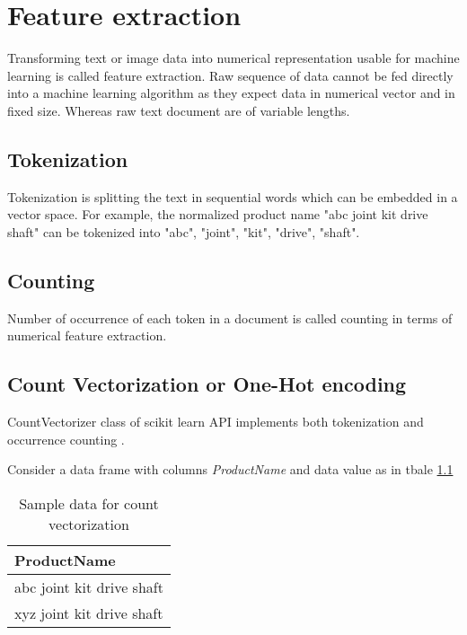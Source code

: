\chapter{Feature extraction}

Transforming text or image data into numerical representation usable for machine learning is called feature extraction. Raw sequence of data cannot be fed directly into a machine learning algorithm as they expect data in numerical vector and in fixed size. Whereas raw text document are of variable lengths. 

\section{Tokenization}

Tokenization is splitting the text in sequential words which can be embedded in a vector space.
For example, the normalized product name "abc joint kit drive shaft" can be tokenized into "abc", "joint", "kit", "drive", "shaft". 



\section{Counting}

Number of occurrence of each token in a document is called counting in terms of numerical feature extraction.

\section{Count Vectorization or One-Hot encoding} \label{ch_countvector}


CountVectorizer class of scikit learn API implements both tokenization and occurrence counting \parencite{sklearn_api}. 

Consider a data frame with columns \textit{ProductName} and data value as in tbale \ref{table:count_vectorization}

\begin{table}[h]
    \centering
    \caption{Sample data for count vectorization}
    \label{table:count_vectorization}
    \begin{tabular}{ l }
          \toprule
          
          \textbf{ProductName}\\
          \midrule
          abc joint kit drive shaft\\
          xyz joint kit drive shaft\\
         
          \bottomrule
          \end{tabular}
\end{table}

